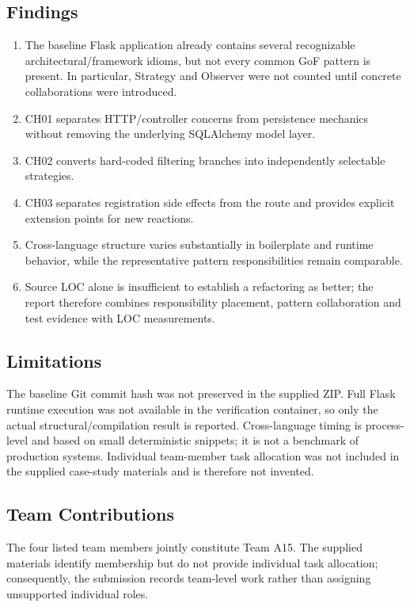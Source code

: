 \documentclass[11pt,a4paper]{article}
\begin{document}
\subsection{Findings}
\begin{enumerate}
\item The baseline Flask application already contains several recognizable architectural/framework idioms, but not every common GoF pattern is present. In particular, Strategy and Observer were not counted until concrete collaborations were introduced.
\item CH01 separates HTTP/controller concerns from persistence mechanics without removing the underlying SQLAlchemy model layer.
\item CH02 converts hard-coded filtering branches into independently selectable strategies.
\item CH03 separates registration side effects from the route and provides explicit extension points for new reactions.
\item Cross-language structure varies substantially in boilerplate and runtime behavior, while the representative pattern responsibilities remain comparable.
\item Source LOC alone is insufficient to establish a refactoring as better; the report therefore combines responsibility placement, pattern collaboration and test evidence with LOC measurements.
\end{enumerate}

\subsection{Limitations}
The baseline Git commit hash was not preserved in the supplied ZIP. Full Flask runtime execution was not available in the verification container, so only the actual structural/compilation result is reported. Cross-language timing is process-level and based on small deterministic snippets; it is not a benchmark of production systems. Individual team-member task allocation was not included in the supplied case-study materials and is therefore not invented.

\subsection{Team Contributions}
The four listed team members jointly constitute Team A15. The supplied materials identify membership but do not provide individual task allocation; consequently, the submission records team-level work rather than assigning unsupported individual roles.
\end{document}
